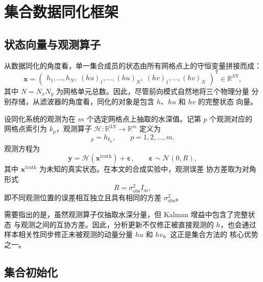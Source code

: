 \documentclass[12pt,a4paper]{article}
\newcommand{\x}{\bm{x}}
\newcommand{\y}{\bm{y}}
\newcommand{\T}{^{\mathsf T}}
\newcommand{\R}{\mathbb{R}}
\newcommand{\calH}{\mathcal{H}}
\begin{document}
\section{集合数据同化框架}
\label{sec:framework}

\subsection{状态向量与观测算子}

从数据同化的角度看，单一集合成员的状态由所有网格点上的守恒变量拼接而成：
\begin{equation}
  \x
  =
  \begin{pmatrix}
    h_1, \dots, h_N,\;
    (hu)_1, \dots, (hu)_N,\;
    (hv)_1, \dots, (hv)_N
  \end{pmatrix}\T
  \in \R^{3N},
  \label{eq:full-state}
\end{equation}
其中 $N = N_x N_y$ 为网格单元总数。因此，尽管前向模式自然地将三个物理分量
分别存储，从滤波器的角度看，同化的对象是包含 $h$、$hu$ 和 $hv$ 的完整状态
向量。

设同化系统的观测为在 $m$ 个选定网格点上抽取的水深值。记第 $p$ 个观测对应的
网格点索引为 $k_p$，观测算子 $\calH: \R^{3N} \to \R^m$ 定义为
\begin{equation}
  [\calH(\x)]_p = h_{k_p}, \qquad p = 1, 2, \dots, m.
  \label{eq:obs-operator}
\end{equation}
观测方程为
\begin{equation}
  \y = \calH(\x^{\mathrm{truth}}) + \bm{\varepsilon},
  \qquad
  \bm{\varepsilon} \sim \mathcal{N}(0, R),
  \label{eq:obs-model}
\end{equation}
其中 $\x^{\mathrm{truth}}$ 为未知的真实状态。在本文的合成实验中，观测误差
协方差取为对角形式
\begin{equation}
  R = \sigma_{\mathrm{obs}}^2 I_m,
  \label{eq:R-diag}
\end{equation}
即不同观测位置的误差相互独立且具有相同的方差 $\sigma_{\mathrm{obs}}^2$。

需要指出的是，虽然观测算子仅抽取水深分量，但 Kalman 增益中包含了完整状态
与观测之间的互协方差。因此，分析更新不仅修正被直接观测的 $h$，也会通过
样本相关性同步修正未被观测的动量分量 $hu$ 和 $hv$。这正是集合方法的
核心优势之一。

\subsection{集合初始化}
\end{document}
